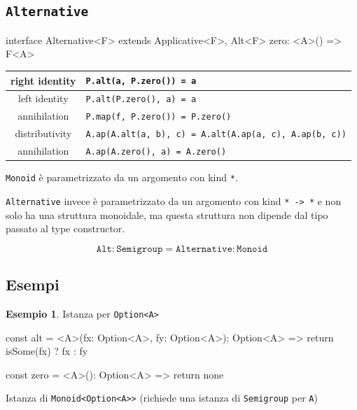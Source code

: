 \documentclass[12pt]{article}
\theoremstyle{definition}
\newtheorem{example}{Esempio}[section]
\newenvironment{code}
  {\vspace{0.5cm} \VerbatimEnvironment\begin{typescriptcode}}
  {\end{typescriptcode} \vspace{0.2cm}}
\begin{document}
\subsection{\texttt{Alternative}}

\begin{code}
interface Alternative<F> extends Applicative<F>, Alt<F> {
  zero: <A>() => F<A>
}
\end{code}

\begin{center}
\bgroup
\def\arraystretch{1.5}
\begin{tabular}{ |c|p{10cm}| }
\hline
right identity & \texttt{P.alt(a, P.zero()) = a} \\
\hline
left identity & \texttt{P.alt(P.zero(), a) = a} \\
\hline
annihilation & \texttt{P.map(f, P.zero()) = P.zero()} \\
\hline
distributivity & \texttt{A.ap(A.alt(a, b), c) = A.alt(A.ap(a, c), A.ap(b, c))} \\
\hline
annihilation & \texttt{A.ap(A.zero(), a) = A.zero()} \\
\hline
\end{tabular}
\egroup
\end{center}

\texttt{Monoid} è parametrizzato da un argomento con kind \texttt{*}.

\texttt{Alternative} invece è parametrizzato da un argomento con kind \texttt{* -> *} e non solo ha una struttura monoidale,
ma questa struttura non dipende dal tipo passato al type constructor.

$$
\texttt{Alt} : \texttt{Semigroup} = \texttt{Alternative} : \texttt{Monoid}
$$

\subsection{Esempi}

\begin{example}
Istanza per \texttt{Option<A>}

\begin{code}
const alt = <A>(fx: Option<A>, fy: Option<A>): Option<A> => {
  return isSome(fx) ? fx : fy
}

const zero = <A>(): Option<A> => {
  return none
}
\end{code}
\end{example}

Istanza di \texttt{Monoid<Option<A>>} (richiede una istanza di \texttt{Semigroup} per \texttt{A})
\end{document}
